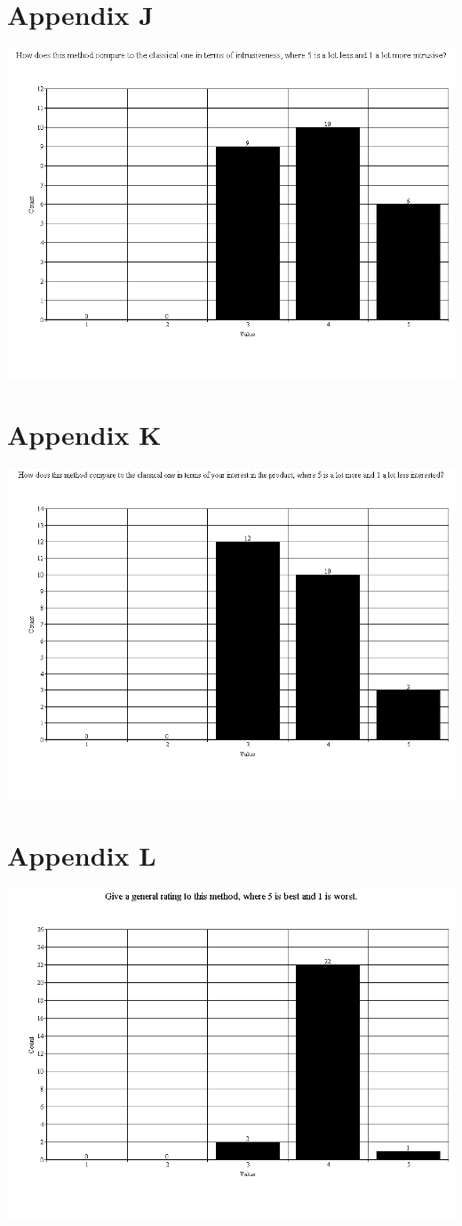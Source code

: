 \section{Appendix J}
\includegraphics[scale=0.5]{Images/q11}
\section{Appendix K}
\includegraphics[scale=0.5]{Images/q12}
\section{Appendix L}
\includegraphics[scale=0.5]{Images/q14}